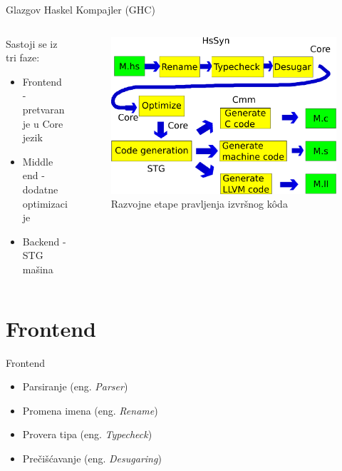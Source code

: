 \documentclass{beamer}
\begin{document}
\begin{frame}{Glazgov Haskel Kompajler (GHC) }
	\begin{columns}
		\begin{column}{4cm}
			
			Sastoji se iz tri faze:
			
			\begin{itemize}
				\item Frontend - pretvaranje u Core jezik
				\item Middle end - dodatne optimizacije 
				\item Backend - STG mašina
			\end{itemize}
		\end{column}
		\begin{column}{6cm}
			\begin{figure}[h!]
				\begin{center}
					\includegraphics[scale=0.20]{../resources/razvojneEtape.png}
				\end{center}
				\caption{Razvojne etape pravljenja izvršnog k\^{o}da}
				\label{fig:razvojneEtaple}
			\end{figure}
		\end{column}
	\end{columns}
\end{frame}

\section{Frontend}

\begin{frame}{Frontend}
	\begin{itemize}
		\item Parsiranje (eng. \emph{Parser})
		\item Promena imena (eng. \emph{Rename}) 
		\item Provera tipa (eng. \emph{Typecheck})
		\item Prečišćavanje (eng. \emph{Desugaring})
	\end{itemize} 
\end{frame}
\end{document}

